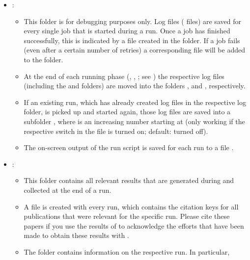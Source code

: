 \documentclass[english,11pt]{article}
\begin{document}
\begin{itemize}
\begin{itemize}[leftmargin=*]
\end{itemize}
\item {}:\\[-0.7cm]
\begin{itemize}[leftmargin=*]
\item This folder is for debugging purposes only. Log files ( files) are saved for every single job that is started during a run. Once a job has finished successfully, this is indicated by a file created in the  folder. If a job fails (even after a certain number of retries) a corresponding file will be added to the  folder.%
\item At the end of each running phase (\gridrun{}, \premainrun{}, \mainrun{}; see ) the respective log files (including the  and  folders) are moved into the folders ,  and , respectively.%
\item If an existing run, which has already created log files 
in the respective log folder, is picked up and started again, those log files are saved into a subfolder , where  is an increasing number starting at  (only working if the respective switch in the file  is turned on; default: turned off).
\item The on-screen output of the \Matrix{} run script is saved for each run to a file .
\end{itemize}
\item {}:\\[-0.7cm]
\begin{itemize}[leftmargin=*]
\item This folder contains all relevant results that are generated during and collected at the end of a run.%
\item A file  is created with every run, which contains the citation keys for all publications that were relevant for the specific run.
Please cite these papers if you use the results of \Matrix{} to acknowledge the efforts that have been made to obtain these results with \Matrix{}.
\item The folder  contains information on the respective run. In particular, 

\end{itemize}
\end{itemize}
\end{document}
